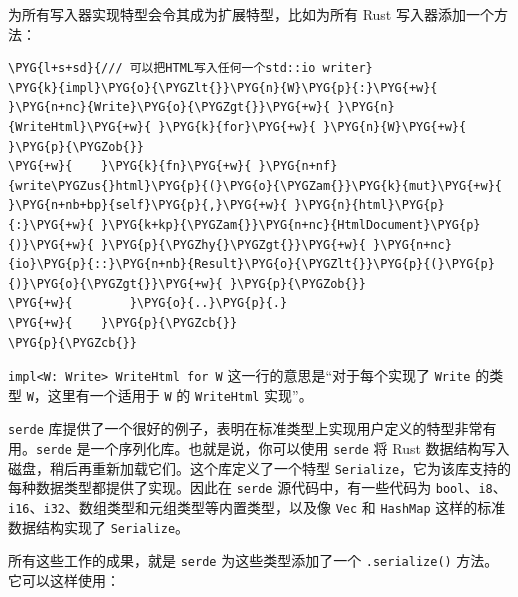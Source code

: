 为所有写入器实现特型会令其成为扩展特型，比如为所有 Rust 写入器添加一个方法：

\begin{Verbatim}[commandchars=\\\{\},breaklines=true,breakanywhere=true,fontsize=\codefont,xleftmargin=17bp]
\PYG{l+s+sd}{/// 可以把HTML写入任何一个std::io writer}
\PYG{k}{impl}\PYG{o}{\PYGZlt{}}\PYG{n}{W}\PYG{p}{:}\PYG{+w}{ }\PYG{n+nc}{Write}\PYG{o}{\PYGZgt{}}\PYG{+w}{ }\PYG{n}{WriteHtml}\PYG{+w}{ }\PYG{k}{for}\PYG{+w}{ }\PYG{n}{W}\PYG{+w}{ }\PYG{p}{\PYGZob{}}
\PYG{+w}{    }\PYG{k}{fn}\PYG{+w}{ }\PYG{n+nf}{write\PYGZus{}html}\PYG{p}{(}\PYG{o}{\PYGZam{}}\PYG{k}{mut}\PYG{+w}{ }\PYG{n+nb+bp}{self}\PYG{p}{,}\PYG{+w}{ }\PYG{n}{html}\PYG{p}{:}\PYG{+w}{ }\PYG{k+kp}{\PYGZam{}}\PYG{n+nc}{HtmlDocument}\PYG{p}{)}\PYG{+w}{ }\PYG{p}{\PYGZhy{}\PYGZgt{}}\PYG{+w}{ }\PYG{n+nc}{io}\PYG{p}{::}\PYG{n+nb}{Result}\PYG{o}{\PYGZlt{}}\PYG{p}{(}\PYG{p}{)}\PYG{o}{\PYGZgt{}}\PYG{+w}{ }\PYG{p}{\PYGZob{}}
\PYG{+w}{        }\PYG{o}{..}\PYG{p}{.}
\PYG{+w}{    }\PYG{p}{\PYGZcb{}}
\PYG{p}{\PYGZcb{}}
\end{Verbatim}

\texttt{impl<W: Write> WriteHtml for W} 这一行的意思是“对于每个实现了 \texttt{Write} 的类型 \texttt{W}，这里有一个适用于 \texttt{W} 的 \texttt{WriteHtml} 实现”。

\texttt{serde} 库提供了一个很好的例子，表明在标准类型上实现用户定义的特型非常有用。\texttt{serde} 是一个序列化库。也就是说，你可以使用 \texttt{serde} 将 Rust 数据结构写入磁盘，稍后再重新加载它们。这个库定义了一个特型 \texttt{Serialize}，它为该库支持的每种数据类型都提供了实现。因此在 \texttt{serde} 源代码中，有一些代码为 \texttt{bool}、\texttt{i8}、\texttt{i16}、\texttt{i32}、数组类型和元组类型等内置类型，以及像 \texttt{Vec} 和 \texttt{HashMap} 这样的标准数据结构实现了 \texttt{Serialize}。

所有这些工作的成果，就是 \texttt{serde} 为这些类型添加了一个 \texttt{.serialize()} 方法。它可以这样使用：

